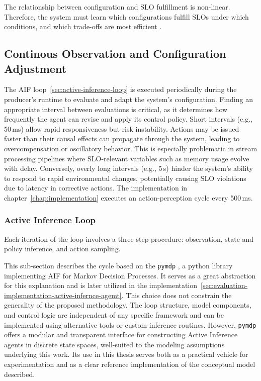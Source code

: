 The relationship between configuration and SLO fulfillment is non-linear. Therefore, the system must learn which configurations fulfill SLOs under which conditions, and which trade-offs are most efficient \cite{sedlak_towards_2025}.

\subsection{Continous Observation and Configuration Adjustment}
The AIF loop~\ref{sec:active-inference-loop} is executed periodically during the producer's runtime to evaluate and adapt the system's configuration. Finding an appropriate interval between evaluations is critical, as it determines how frequently the agent can revise and apply its control policy. Short intervals (e.g., 50\,ms) allow rapid responsiveness but risk instability. Actions may be issued faster than their causal effects can propagate through the system, leading to overcompensation or oscillatory behavior. This is especially problematic in stream processing pipelines where SLO-relevant variables such as memory usage evolve with delay. Conversely, overly long intervals (e.g., 5\,s) hinder the system’s ability to respond to rapid environmental changes, potentially causing SLO violations due to latency in corrective actions. The implementation in chapter~\ref{chap:implementation} executes an action-perception cycle every 500\,ms.

\subsubsection{Active Inference Loop}
Each iteration of the loop involves a three-step procedure: observation, state and policy inference, and action sampling.

This sub-section describes the cycle based on the \texttt{pymdp} \cite{heins_pymdp_2022}, a python library implementing AIF for Markov Decision Processes. It serves as a great abstraction for this explanation and is later utilized in the implementation~\ref{sec:evaluation-implementation-active-infernce-agemt}. This choice does not constrain the generality of the proposed methodology. The loop structure, model components, and control logic are independent of any specific framework and can be implemented using alternative tools or custom inference routines. However, \texttt{pymdp} offers a modular and transparent interface for constructing Active Inference agents in discrete state spaces, well-suited to the modeling assumptions underlying this work. Its use in this thesis serves both as a practical vehicle for experimentation and as a clear reference implementation of the conceptual model described. 

